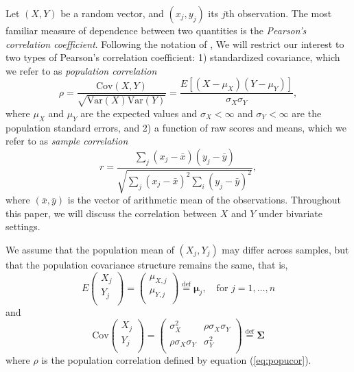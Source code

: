 \documentclass[12pt, a4paper]{article}
\newcommand{\cov}{\text{Cov}}
\newcommand{\var}{\text{Var}}
\newcommand{\samplecor}{sample correlation}
\newcommand{\popucor}{population correlation}
\begin{document}
	Let $(X, Y)$ be a random vector, and $(x_j, y_j)$ its $j$th observation. The most familiar measure of dependence between two quantities is 
	the \textit{Pearson's correlation coefficient}.  Following the notation of \citet{lee1988thirteen}, We will restrict our interest to two 
	types of Pearson's correlation coefficient: 1) standardized covariance, which we refer to as \textit{\popucor}
	\begin{equation}\label{eq:popucor}
		\rho =\dfrac{\cov(X, Y)}{\sqrt{\var(X)\var(Y)}} = \dfrac{E[(X-\mu_X)(Y-\mu_Y)]}{\sigma_X\sigma_Y}, 
	\end{equation} 	where $\mu_X$ and $\mu_Y$ are the expected values and $\sigma_X<\infty$ and $\sigma_Y<\infty$ are the population standard errors, and 2) a function of raw scores and means, which we refer to as \textit{\samplecor}
	\begin{equation}\label{eq:samplecor}
	r  =  \dfrac{\sum_j (x_j -\bar{x})(y_j - \bar{y})}{\sqrt{\sum_{j}(x_j - \bar{x})^2\sum_i(y_j - \bar{y})^2}}, 
	\end{equation}
	where $(\bar{x}, \bar{y})$ is the vector of arithmetic mean of the observations.
	Throughout this paper, we will discuss the correlation between $X$ and $Y$ under bivariate settings. 


	 We assume that the population mean of $(X_j, Y_j)$ may differ across samples, but that the population covariance structure remains the 
	 same, that is,  
		\begin{equation}\label{eq:meanstruct}
		E  \left(\begin{array}{c}
		X_j\\
		Y_j\\	
		\end{array} \right) 
		 = 	\left(\begin{array}{c}
		\mu_{X,j}\\
		\mu_{Y,j}\\
		\end{array} \right)\stackrel{\text{def}}{=} \bm \mu_j,  \text{~~ for $j = 1, \ldots, n$}
		\end{equation}
	and 
		\begin{equation}\label{eq:covstruct}
		\cov\left(\begin{array}{c}
		X_j\\
		Y_j\\	
		\end{array} \right)	
		= \left(
		\begin{array}{cc}
		\sigma_X^2 &\rho \sigma_X\sigma_Y \\
		\rho \sigma_X \sigma_Y & 	\sigma_Y^2 \\
		\end{array} 
		\right)
		\stackrel{\text{def}}{=} \bm \Sigma 
		\end{equation}
	where $\rho$ is the population correlation defined by equation (\ref{eq:popucor}).
	
\end{document}
